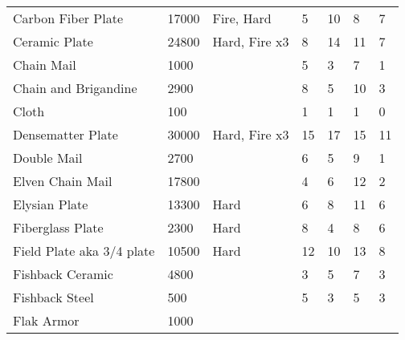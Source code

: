 \documentclass[twoside]{book}
\begin{document}
\begin{longtable}{p{1.25in}llp{2em}p{2em}p{2em}p{2em}}
  \raggedright
           Carbon Fiber Plate 
  &
   17000 
  &
   Fire, Hard 
  &
   5 
  &
   10 
  &
   8 
  &
   7 
  \tabularnewline
      
  \raggedright
           Ceramic Plate 
  &
   24800 
  &
   Hard, Fire x3 
  &
   8 
  &
   14 
  &
   11 
  &
   7 
  \tabularnewline
      
  \raggedright
           Chain Mail 
  &
   1000 
  &
  
  &
   5 
  &
   3 
  &
   7 
  &
   1 
  \tabularnewline
      
  \raggedright
           Chain and Brigandine 
  &
   2900 
  &
  
  &
   8 
  &
   5 
  &
   10 
  &
   3 
  \tabularnewline
      
  \raggedright
           Cloth 
  &
   100 
  &
  
  &
   1 
  &
   1 
  &
   1 
  &
   0 
  \tabularnewline
      
  \raggedright
           Densematter Plate 
  &
   30000 
  &
   Hard, Fire x3 
  &
   15 
  &
   17 
  &
   15 
  &
   11 
  \tabularnewline
      
  \raggedright
           Double Mail 
  &
   2700 
  &
  
  &
   6 
  &
   5 
  &
   9 
  &
   1 
  \tabularnewline
      
  \raggedright
           Elven Chain Mail 
  &
   17800 
  &
  
  &
   4 
  &
   6 
  &
   12 
  &
   2 
  \tabularnewline
      
  \raggedright
           Elysian Plate 
  &
   13300 
  &
   Hard 
  &
   6 
  &
   8 
  &
   11 
  &
   6 
  \tabularnewline
      
  \raggedright
           Fiberglass Plate 
  &
   2300 
  &
   Hard 
  &
   8 
  &
   4 
  &
   8 
  &
   6 
  \tabularnewline
      
  \raggedright
           Field Plate aka 3/4 plate
           
  &
   10500 
  &
   Hard 
  &
   12 
  &
   10 
  &
   13 
  &
   8 
  \tabularnewline
      
  \raggedright
           Fishback Ceramic 
  &
   4800 
  &
  
  &
   3 
  &
   5 
  &
   7 
  &
   3 
  \tabularnewline
      
  \raggedright
           Fishback Steel 
  &
   500 
  &
  
  &
   5 
  &
   3 
  &
   5 
  &
   3 
  \tabularnewline
      
  \raggedright
           Flak Armor 
  &
   1000 
  &
  

\end{longtable}
\end{document}
